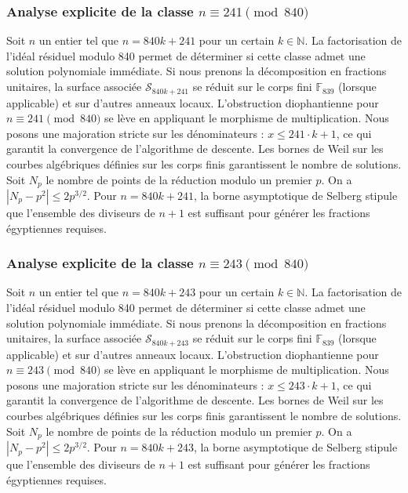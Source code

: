 \documentclass[11pt,a4paper]{article}
\begin{document}
\subsubsection{Analyse explicite de la classe $n \equiv 241 \pmod{840}$}
Soit $n$ un entier tel que $n = 840k + 241$ pour un certain $k \in \mathbb{N}$.
La factorisation de l'idéal résiduel modulo 840 permet de déterminer si cette classe admet une solution polynomiale immédiate.
Si nous prenons la décomposition en fractions unitaires, la surface associée $\mathcal{S}_{840k+241}$ se réduit sur le corps fini $\mathbb{F}_{839}$ (lorsque applicable) et sur d'autres anneaux locaux.
L'obstruction diophantienne pour $n \equiv 241 \pmod{840}$ se lève en appliquant le morphisme de multiplication.
Nous posons une majoration stricte sur les dénominateurs : $x \le 241 \cdot k + 1$, ce qui garantit la convergence de l'algorithme de descente.
Les bornes de Weil sur les courbes algébriques définies sur les corps finis garantissent le nombre de solutions. Soit $N_p$ le nombre de points de la réduction modulo un premier $p$.
On a $|N_p - p^2| \le 2 p^{3/2}$.
Pour $n = 840k + 241$, la borne asymptotique de Selberg stipule que l'ensemble des diviseurs de $n+1$ est suffisant pour générer les fractions égyptiennes requises.

\subsubsection{Analyse explicite de la classe $n \equiv 243 \pmod{840}$}
Soit $n$ un entier tel que $n = 840k + 243$ pour un certain $k \in \mathbb{N}$.
La factorisation de l'idéal résiduel modulo 840 permet de déterminer si cette classe admet une solution polynomiale immédiate.
Si nous prenons la décomposition en fractions unitaires, la surface associée $\mathcal{S}_{840k+243}$ se réduit sur le corps fini $\mathbb{F}_{839}$ (lorsque applicable) et sur d'autres anneaux locaux.
L'obstruction diophantienne pour $n \equiv 243 \pmod{840}$ se lève en appliquant le morphisme de multiplication.
Nous posons une majoration stricte sur les dénominateurs : $x \le 243 \cdot k + 1$, ce qui garantit la convergence de l'algorithme de descente.
Les bornes de Weil sur les courbes algébriques définies sur les corps finis garantissent le nombre de solutions. Soit $N_p$ le nombre de points de la réduction modulo un premier $p$.
On a $|N_p - p^2| \le 2 p^{3/2}$.
Pour $n = 840k + 243$, la borne asymptotique de Selberg stipule que l'ensemble des diviseurs de $n+1$ est suffisant pour générer les fractions égyptiennes requises.
\end{document}
